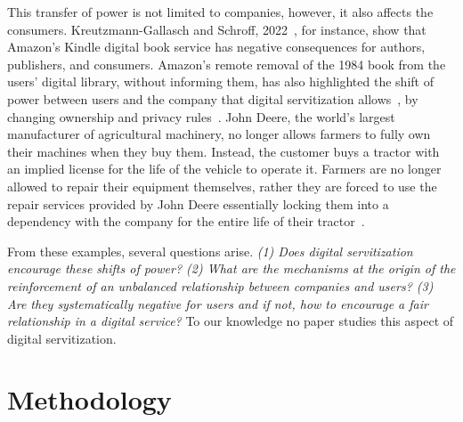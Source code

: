 \documentclass[sigplan,screen,nonacm]{acmart}
\begin{document}
This transfer of power is not limited to companies, however, it also affects the consumers. Kreutzmann-Gallasch and Schroff, 2022~\cite{kreutzmann2022case}, for instance, show that Amazon's Kindle digital book service has negative consequences for authors, publishers, and consumers. Amazon's remote removal of the 1984 book from the users' digital library, without informing them, has also highlighted the shift of power between users and the company that digital servitization allows~\cite{stone2009amazon}, by changing ownership and privacy rules~\cite{albrechtslund2020amazon}. John Deere, the world's largest manufacturer of agricultural machinery, no longer allows farmers to fully own their machines when they buy them. Instead, the customer buys a tractor with an implied license for the life of the vehicle to operate it. Farmers are no longer allowed to repair their equipment themselves, rather they are forced to use the repair services provided by John Deere essentially locking them into a dependency with the company for the entire life of their tractor~\cite{wiens2015we, koebler2017american}. 

From these examples, several questions arise. \textit{(1) Does digital servitization encourage these shifts of power? (2) What are the mechanisms at the origin of the reinforcement of an unbalanced relationship between companies and users? (3) Are they systematically negative for users and if not, how to encourage a fair relationship in a digital service?} To our knowledge no paper studies this aspect of digital servitization. 



\section{Methodology}
\end{document}
